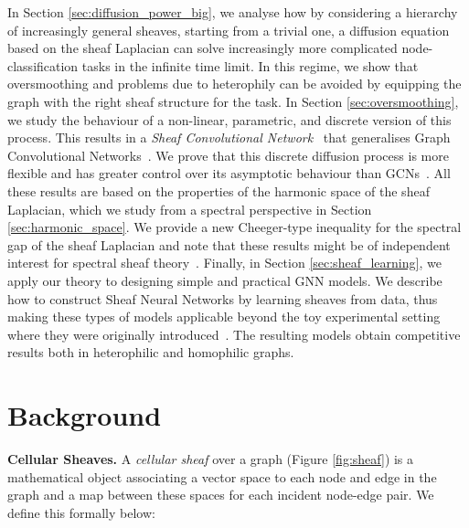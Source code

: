 \documentclass{article}
\begin{document}
In Section \ref{sec:diffusion_power_big}, we analyse how by considering a hierarchy of increasingly general sheaves, starting from a trivial one, a diffusion equation based on the sheaf Laplacian \citep{hansen2019toward} can solve increasingly more complicated node-classification tasks in the infinite time limit. In this regime, we show that oversmoothing and problems due to heterophily can be avoided by equipping the graph with the right sheaf structure for the task. In Section \ref{sec:oversmoothing}, we study the behaviour of a non-linear, parametric, and discrete version of this process. This results in a {\em Sheaf Convolutional Network}~\citep{hansen2020sheaf} that generalises Graph Convolutional Networks~\citep{kipf2017graph}. We prove that this discrete diffusion process is more flexible and has greater control over its asymptotic behaviour than GCNs~\citep{cai2020note, oono2019graph}. 
All these results are based on the properties of the harmonic space of the sheaf Laplacian, which we study from a spectral perspective in Section \ref{sec:harmonic_space}. We provide a new Cheeger-type inequality for the spectral gap of the sheaf Laplacian and note that these results might be of independent interest for spectral sheaf theory~\citep{hansen2019toward}. Finally, in Section \ref{sec:sheaf_learning}, we apply our theory to designing simple and practical GNN models.  
We describe how to construct Sheaf Neural Networks by learning sheaves from data, thus making these types of models applicable beyond the toy experimental setting where they were originally introduced~\citep{hansen2020sheaf}. The resulting models obtain competitive results both in heterophilic and homophilic graphs. 


\section{Background}

\textbf{Cellular Sheaves. } A \emph{cellular sheaf} \citep{curry2014sheaves, shepard1985cellular} over a graph (Figure \ref{fig:sheaf}) is a mathematical object associating a vector space to each node and edge in the graph and a map between these spaces for each incident node-edge pair. We define this formally below:
\end{document}
